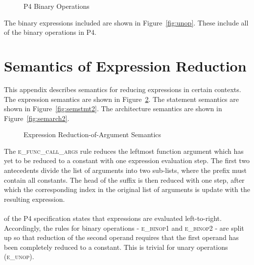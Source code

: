 \documentclass[UTF8]{article}
\begin{document}
\newpage
\begin{figure}[ht!]
\centering\ottgrammartabular{
\ottbinop\ottafterlastrule
}
\caption{P4 Binary Operations}
\label{fig:binop}
\end{figure}

The binary expressions included are shown in Figure~\ref{fig:unop}. These include all of the binary operations in P4.

\section{Semantics of Expression Reduction}
\label{app:exp}
This appendix describes semantics for reducing expressions in certain contexts. The expression semantics are shown in Figure~\ref{fig:semexp2}. The statement semantics are shown in Figure~\ref{fig:semstmt2}. The architecture semantics are shown in Figure~\ref{fig:semarch2}.

\begin{figure}[ht!]
\caption{Expression Reduction-of-Argument Semantics}
\label{fig:semexp2}
\end{figure}

The \textsc{e\_func\_call\_args} rule reduces the leftmost function argument which has yet to be reduced to a constant with one expression evaluation step. The first two antecedents divide the list of arguments into two sub-lists, where the prefix must contain all constants. The head of the suffix is then reduced with one step, after which the corresponding index in the original list of arguments is update with the resulting expression.
\\~\\
 of the P4 specification states that expressions are evaluated left-to-right. Accordingly, the rules for binary operations - \textsc{e\_binop1} and \textsc{e\_binop2} - are split up so that reduction of the second operand requires that the first operand has been completely reduced to a constant. This is trivial for unary operations (\textsc{e\_unop}).
\end{document}
